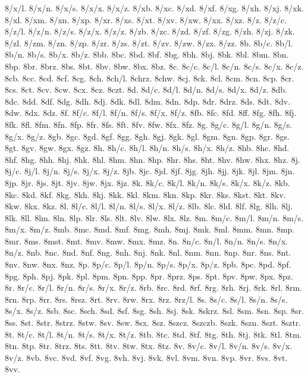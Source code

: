{8/x/l.
8/x/n.
8/x/s.
8/x/x.
8/x/z.
8/xb.
8/xc.
8/xd.
8/xf.
8/xg.
8/xh.
8/xj.
8/xk.
8/xl.
8/xm.
8/xn.
8/xp.
8/xr.
8/xs.
8/xt.
8/xv.
8/xw.
8/xx.
8/xz.
8/z.
8/z/c.
8/z/l.
8/z/n.
8/z/s.
8/z/x.
8/z/z.
8/zb.
8/zc.
8/zd.
8/zf.
8/zg.
8/zh.
8/zj.
8/zk.
8/zl.
8/zm.
8/zn.
8/zp.
8/zr.
8/zs.
8/zt.
8/zv.
8/zw.
8/zx.
8/zz.
8b.
8b/c.
8b/l.
8b/n.
8b/s.
8b/x.
8b/z.
8bb.
8bc.
8bd.
8bf.
8bg.
8bh.
8bj.
8bk.
8bl.
8bm.
8bn.
8bp.
8br.
8brz.
8bs.
8bt.
8bv.
8bw.
8bx.
8bz.
8c.
8c/c.
8c/l.
8c/n.
8c/s.
8c/x.
8c/z.
8cb.
8cc.
8cd.
8cf.
8cg.
8ch.
8ch/l.
8chrz.
8chw.
8cj.
8ck.
8cl.
8cm.
8cn.
8cp.
8cr.
8cs.
8ct.
8cv.
8cw.
8cx.
8cz.
8czt.
8d.
8d/c.
8d/l.
8d/n.
8d/s.
8d/x.
8d/z.
8db.
8dc.
8dd.
8df.
8dg.
8dh.
8dj.
8dk.
8dl.
8dm.
8dn.
8dp.
8dr.
8drz.
8ds.
8dt.
8dv.
8dw.
8dx.
8dz.
8f.
8f/c.
8f/l.
8f/n.
8f/s.
8f/x.
8f/z.
8fb.
8fc.
8fd.
8ff.
8fg.
8fh.
8fj.
8fk.
8fl.
8fm.
8fn.
8fp.
8fr.
8fs.
8ft.
8fv.
8fw.
8fx.
8fz.
8g.
8g/c.
8g/l.
8g/n.
8g/s.
8g/x.
8g/z.
8gb.
8gc.
8gd.
8gf.
8gg.
8gh.
8gj.
8gk.
8gl.
8gm.
8gn.
8gp.
8gr.
8gs.
8gt.
8gv.
8gw.
8gx.
8gz.
8h.
8h/c.
8h/l.
8h/n.
8h/s.
8h/x.
8h/z.
8hb.
8hc.
8hd.
8hf.
8hg.
8hh.
8hj.
8hk.
8hl.
8hm.
8hn.
8hp.
8hr.
8hs.
8ht.
8hv.
8hw.
8hx.
8hz.
8j.
8j/c.
8j/l.
8j/n.
8j/s.
8j/x.
8j/z.
8jb.
8jc.
8jd.
8jf.
8jg.
8jh.
8jj.
8jk.
8jl.
8jm.
8jn.
8jp.
8jr.
8js.
8jt.
8jv.
8jw.
8jx.
8jz.
8k.
8k/c.
8k/l.
8k/n.
8k/s.
8k/x.
8k/z.
8kb.
8kc.
8kd.
8kf.
8kg.
8kh.
8kj.
8kk.
8kl.
8km.
8kn.
8kp.
8kr.
8ks.
8kst.
8kt.
8kv.
8kw.
8kx.
8kz.
8l.
8l/c.
8l/l.
8l/n.
8l/s.
8l/x.
8l/z.
8lb.
8lc.
8ld.
8lf.
8lg.
8lh.
8lj.
8lk.
8ll.
8lm.
8ln.
8lp.
8lr.
8ls.
8lt.
8lv.
8lw.
8lx.
8lz.
8m.
8m/c.
8m/l.
8m/n.
8m/s.
8m/x.
8m/z.
8mb.
8mc.
8md.
8mf.
8mg.
8mh.
8mj.
8mk.
8ml.
8mm.
8mn.
8mp.
8mr.
8ms.
8mst.
8mt.
8mv.
8mw.
8mx.
8mz.
8n.
8n/c.
8n/l.
8n/n.
8n/s.
8n/x.
8n/z.
8nb.
8nc.
8nd.
8nf.
8ng.
8nh.
8nj.
8nk.
8nl.
8nm.
8nn.
8np.
8nr.
8ns.
8nt.
8nv.
8nw.
8nx.
8nz.
8p.
8p/c.
8p/l.
8p/n.
8p/s.
8p/x.
8p/z.
8pb.
8pc.
8pd.
8pf.
8pg.
8ph.
8pj.
8pk.
8pl.
8pm.
8pn.
8pp.
8pr.
8prz.
8ps.
8pt.
8pv.
8pw.
8px.
8pz.
8r.
8r/c.
8r/l.
8r/n.
8r/s.
8r/x.
8r/z.
8rb.
8rc.
8rd.
8rf.
8rg.
8rh.
8rj.
8rk.
8rl.
8rm.
8rn.
8rp.
8rr.
8rs.
8rsz.
8rt.
8rv.
8rw.
8rx.
8rz.
8rz/l.
8s.
8s/c.
8s/l.
8s/n.
8s/s.
8s/x.
8s/z.
8sb.
8sc.
8sch.
8sd.
8sf.
8sg.
8sh.
8sj.
8sk.
8skrz.
8sl.
8sm.
8sn.
8sp.
8sr.
8ss.
8st.
8str.
8strz.
8stw.
8sv.
8sw.
8sx.
8sz.
8szcz.
8szczb.
8szk.
8szn.
8szt.
8sztr.
8t.
8t/c.
8t/l.
8t/n.
8t/s.
8t/x.
8t/z.
8tb.
8tc.
8td.
8tf.
8tg.
8th.
8tj.
8tk.
8tl.
8tm.
8tn.
8tp.
8tr.
8trz.
8ts.
8tt.
8tv.
8tw.
8tx.
8tz.
8v.
8v/c.
8v/l.
8v/n.
8v/s.
8v/x.
8v/z.
8vb.
8vc.
8vd.
8vf.
8vg.
8vh.
8vj.
8vk.
8vl.
8vm.
8vn.
8vp.
8vr.
8vs.
8vt.
8vv.
}
